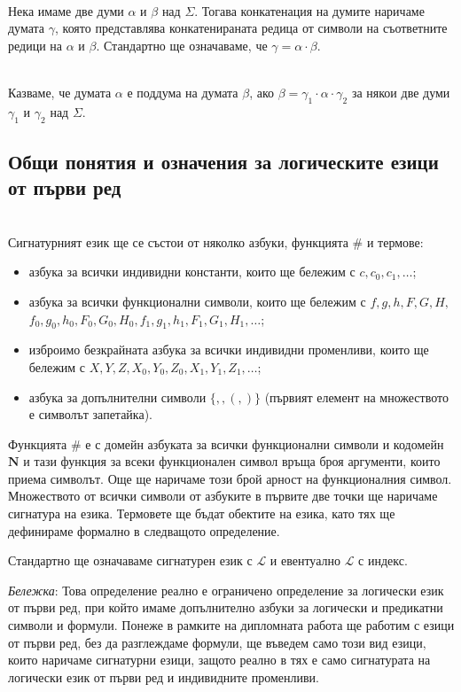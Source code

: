 \documentclass[12pt,twoside,a4paper]{article}
\begin{document}
	\begin{definition}~\\
		\indent Нека имаме две думи $\alpha$ и $\beta$ над $\Sigma$. Тогава конкатенация на думите наричаме думата $\gamma$, която представлява конкатенираната редица от символи на съответните редици на $\alpha$ и $\beta$. Стандартно ще означаваме, че $\gamma = \alpha \cdot \beta$.
	\end{definition}
	
	\begin{denotation}[поддума]~\\
		\indent Казваме, че думата $\alpha$ е поддума на думата $\beta$, ако $\beta = \gamma_1 \cdot \alpha \cdot \gamma_2$ за някои две думи $\gamma_1$ и $\gamma_2$ над $\Sigma$.
	\end{denotation}
	
	\subsection{Общи понятия и означения за логическите езици от първи ред}
	\begin{definition}\label{def:RFOL}~\\
		\indent Сигнатурният език ще се състои от няколко азбуки, функцията $\#$ и термове:
		\begin{itemize}
			\item азбука за всички индивидни константи, които ще бележим с $c, c_0, c_1, \dots$;
			\item азбука за всички функционални символи, които ще бележим с $f, g, h, F, G, H,$ $f_0, g_0, h_0, F_0, G_0, H_0, f_1, g_1, h_1, F_1, G_1, H_1, \dots$;
			\item изброимо безкрайната азбука за всички индивидни променливи, които ще бележим с $X, Y, Z, X_0, Y_0, Z_0, X_1, Y_1, Z_1, \dots$;
			\item азбука за допълнителни символи $\{, , (, )\}$ (първият елемент на множеството е символът запетайка).
		\end{itemize}
		Функцията $\#$ е с домейн азбуката за всички функционални символи и кодомейн $\mathbf{N}$ и тази функция за всеки функционален символ връща броя аргументи, които приема символът. Още ще наричаме този брой арност на функционалния символ. Множеството от всички символи от азбуките в първите две точки ще наричаме сигнатура на езика. Термовете ще бъдат обектите на езика, като тях ще дефинираме формално в следващото определение.
		
		Стандартно ще означаваме сигнатурен език с $\mathcal{L}$ и евентуално $\mathcal{L}$ с индекс.
		
		\textit{Бележка}: Това определение реално е ограничено определение за логически език от първи ред, при който имаме допълнително азбуки за логически и предикатни символи и формули. Понеже в рамките на дипломната работа ще работим с езици от първи ред, без да разглеждаме формули, ще въведем само този вид езици, които наричаме сигнатурни езици, защото реално в тях е само сигнатурата на логически език от първи ред и индивидните променливи.
	\end{definition}
	
\end{document}
